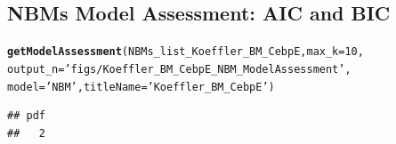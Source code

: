 \documentclass{article}\usepackage[]{graphicx}\usepackage[]{color}
\makeatletter
\newcommand{\hlnum}[1]{\textcolor[rgb]{0.686,0.059,0.569}{#1}}%
\newcommand{\hlstr}[1]{\textcolor[rgb]{0.192,0.494,0.8}{#1}}%
\newcommand{\hlstd}[1]{\textcolor[rgb]{0.345,0.345,0.345}{#1}}%
\newcommand{\hlkwc}[1]{\textcolor[rgb]{0.333,0.667,0.333}{#1}}%
\newcommand{\hlkwd}[1]{\textcolor[rgb]{0.737,0.353,0.396}{\textbf{#1}}}%
\newenvironment{kframe}{%
 \def\at@end@of@kframe{}%
 \ifinner\ifhmode%
  \def\at@end@of@kframe{\end{minipage}}%
  \begin{minipage}{\columnwidth}%
 \fi\fi%
 \def\FrameCommand##1{\hskip\@totalleftmargin \hskip-\fboxsep
 \colorbox{shadecolor}{##1}\hskip-\fboxsep
     \hskip-\linewidth \hskip-\@totalleftmargin \hskip\columnwidth}%
 \MakeFramed {\advance\hsize-\width
   \@totalleftmargin\z@ \linewidth\hsize
   \@setminipage}}%
 {\par\unskip\endMakeFramed%
 \at@end@of@kframe}
\newenvironment{knitrout}{}{} %
\makeatother
\begin{document}
\subsection{NBMs Model Assessment: AIC and BIC}

\begin{knitrout}
\color{fgcolor}\begin{kframe}
\begin{alltt}
\hlkwd{getModelAssessment}\hlstd{(NBMs_list_Koeffler_BM_CebpE,} \hlkwc{max_k} \hlstd{=} \hlnum{10}\hlstd{,}
                   \hlkwc{output_n}\hlstd{=}\hlstr{'figs/Koeffler_BM_CebpE_NBM_ModelAssessment'}\hlstd{,}
                   \hlkwc{model}\hlstd{=}\hlstr{'NBM'}\hlstd{,} \hlkwc{titleName}\hlstd{=}\hlstr{'Koeffler_BM_CebpE'}\hlstd{)}
\end{alltt}
\begin{verbatim}
## pdf 
##   2
\end{verbatim}
\end{kframe}
\end{knitrout}
\end{document}
